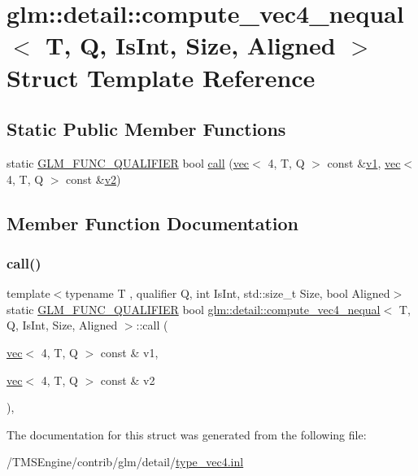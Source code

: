 \hypertarget{structglm_1_1detail_1_1compute__vec4__nequal}{}\section{glm\+:\+:detail\+:\+:compute\+\_\+vec4\+\_\+nequal$<$ T, Q, Is\+Int, Size, Aligned $>$ Struct Template Reference}
\label{structglm_1_1detail_1_1compute__vec4__nequal}
\subsection*{Static Public Member Functions}
\begin{DoxyCompactItemize}
\item 
static \hyperlink{setup_8hpp_a33fdea6f91c5f834105f7415e2a64407}{G\+L\+M\+\_\+\+F\+U\+N\+C\+\_\+\+Q\+U\+A\+L\+I\+F\+I\+ER} bool \hyperlink{structglm_1_1detail_1_1compute__vec4__nequal_a3f11c3a7f2b2349d938936b8a68e26b4}{call} (\hyperlink{structglm_1_1vec}{vec}$<$ 4, T, Q $>$ const \&\hyperlink{_s_d_l__opengl__glext_8h_a435c176a02c061b43e19bdf7c86cceae}{v1}, \hyperlink{structglm_1_1vec}{vec}$<$ 4, T, Q $>$ const \&\hyperlink{_s_d_l__opengl__glext_8h_a0928f6d0f0f794ba000a21dfae422136}{v2})
\end{DoxyCompactItemize}


\subsection{Member Function Documentation}
\mbox{\label{structglm_1_1detail_1_1compute__vec4__nequal_a3f11c3a7f2b2349d938936b8a68e26b4}} 
\subsubsection{\texorpdfstring{call()}{call()}}
{\footnotesize\ttfamily template$<$typename T , qualifier Q, int Is\+Int, std\+::size\+\_\+t Size, bool Aligned$>$ \\
static \hyperlink{setup_8hpp_a33fdea6f91c5f834105f7415e2a64407}{G\+L\+M\+\_\+\+F\+U\+N\+C\+\_\+\+Q\+U\+A\+L\+I\+F\+I\+ER} bool \hyperlink{structglm_1_1detail_1_1compute__vec4__nequal}{glm\+::detail\+::compute\+\_\+vec4\+\_\+nequal}$<$ T, Q, Is\+Int, Size, Aligned $>$\+::call (\begin{DoxyParamCaption}\item[{\hyperlink{structglm_1_1vec}{vec}$<$ 4, T, Q $>$ const \&}]{v1,  }\item[{\hyperlink{structglm_1_1vec}{vec}$<$ 4, T, Q $>$ const \&}]{v2 }\end{DoxyParamCaption})\hspace{0.3cm}{\ttfamily [inline]}, {\ttfamily [static]}}



The documentation for this struct was generated from the following file\+:\begin{DoxyCompactItemize}
\item 
/\+T\+M\+S\+Engine/contrib/glm/detail/\hyperlink{type__vec4_8inl}{type\+\_\+vec4.\+inl}\end{DoxyCompactItemize}
